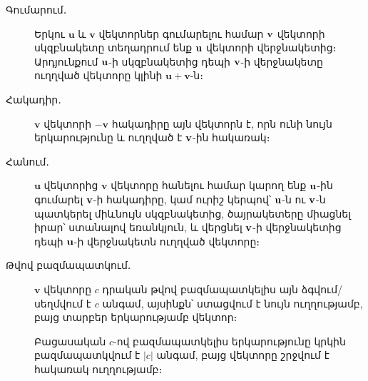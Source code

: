 \begin{description}
\item[Գումարում․] Երկու $\mathbf{u}$ և $\mathbf{v}$ վեկտորներ գումարելու համար $\mathbf{v}$ վեկտորի սկզբնակետը տեղադրում ենք $\mathbf{u}$ վեկտորի վերջնակետից։ Արդյուն\-քում $\mathbf{u}$-ի սկզբնակետից դեպի $\mathbf{v}$-ի վերջնակետը ուղղված վեկտորը կլինի $\mathbf{u} + \mathbf{v}$-ն։

\begin{center}
\end{center}

\item[Հակադիր․] $\mathbf{v}$ վեկտորի $-\mathbf{v}$ հակադիրը այն վեկտորն է, որն ունի նույն երկարությունը և ուղղված է $\mathbf{v}$-ին հակառակ։

    \begin{center}
    \end{center}

\item[Հանում․] $\mathbf{u}$ վեկտորից $\mathbf{v}$ վեկտորը հանելու համար կարող ենք $\mathbf{u}$-ին գումարել $\mathbf{v}$-ի հակադիրը, կամ ուրիշ կերպով՝ $\mathbf{u}$-ն ու $\mathbf{v}$-ն պատկերել միևնույն սկզբնակետից, ծայրակետերը միացնել իրար՝ ստանալով եռանկյուն, և վերցնել $\mathbf{v}$-ի վերջնակետից դեպի $\mathbf{u}$-ի վերջնակետն ուղղված վեկտորը։

\begin{center}
\end{center}


\item[Թվով բազմապատկում․] $\mathbf{v}$ վեկտորը $c$ դրական թվով բազմապատկելիս այն ձգվում/սեղմվում է $c$ անգամ, այսինքն՝ ստացվում է նույն ուղղությամբ, բայց տարբեր երկարությամբ վեկտոր։

\begin{center}
\end{center}

Բացասական $c$-ով բազմապատկելիս երկարությունը կրկին բազմապատկվում է $|c|$ անգամ, բայց վեկտորը շրջվում է հակառակ ուղղությամբ։
\end{description}


